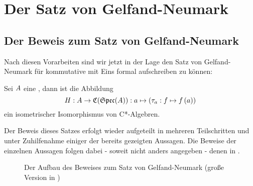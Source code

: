 \section{Der Satz von Gelfand-Neumark}\label{sec:GN}









\subsection{Der Beweis zum Satz von Gelfand-Neumark}

Nach diesen Vorarbeiten sind wir jetzt in der Lage den Satz von Gelfand-Neumark für kommutative \CAlgn{} mit Eins formal aufschreiben zu können: 

\begin{satz}\label{satz:GN}
Sei $A$ eine \CAlg, dann ist die Abbildung
\[H: A \to \mathfrak{C}(\mathfrak{Spec}(A)): a \mapsto \left(\tau_a: f \mapsto f\left(a\right)\right)\]
ein isometrischer Isomorphismus von C*-Algebren.
\end{satz}

Der Beweis dieses Satzes erfolgt wieder aufgeteilt in mehreren Teilschritten und unter Zuhilfenahme einiger der bereits gezeigten Aussagen. Die Beweise der einzelnen Aussagen folgen dabei - soweit nicht anders angegeben - denen in \cite[S. 49-69]{Baer2003}.
\begin{figure}[h]
\begin{tiny}
	
\end{tiny}
	\caption{Der Aufbau des Beweises zum Satz von Gelfand-Neumark (große Version in )}
\end{figure}







